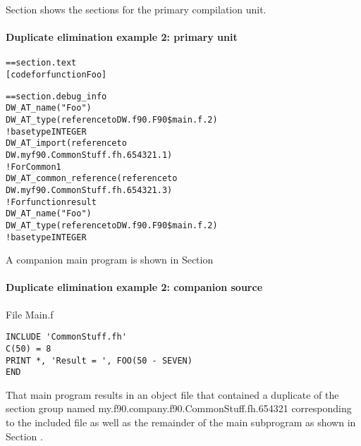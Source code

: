 Section 
shows the sections for the primary compilation unit.



\paragraph{Duplicate elimination example 2: primary unit }
\label{app:duplicateeliminationexample2primaryunit}
\begin{alltt}
== section .text
    [code for function Foo]

== section .debug\_info
            DW\-\_AT\-\_name("Foo")
            DW\-\_AT\-\_type(reference to DW.f90.F90\$main.f.2)
                ! base type INTEGER
                DW\-\_AT\-\_import(reference to
                    DW.myf90.CommonStuff.fh.654321.1)
             ! For Common1
                DW\-\_AT\-\_common\-\_reference(reference to
                    DW.myf90.CommonStuff.fh.654321.3)
             ! For function result
                DW\-\_AT\-\_name("Foo")
                    DW\-\_AT\-\_type(reference to DW.f90.F90\$main.f.2)
                        ! base type INTEGER
\end{alltt}

A companion main program is shown in 
Section 

\paragraph{Duplicate elimination example 2: companion source }
\label{app:duplicateeliminationexample2companionsource}

File Main.f 

\begin{lstlisting}
INCLUDE 'CommonStuff.fh'
C(50) = 8
PRINT *, 'Result = ', FOO(50 - SEVEN)
END
\end{lstlisting}

That main program results in an object file that
contained a duplicate of the section group named
my.f90.company.f90.CommonStuff.fh.654321 
corresponding to the
included file as well as the remainder of the main subprogram
as shown in 
Section .

